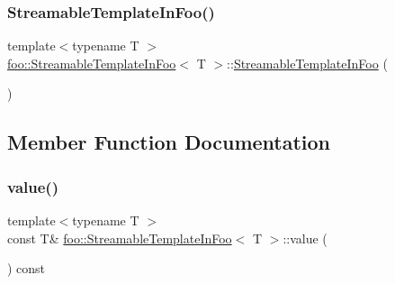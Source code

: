 \subsubsection{\texorpdfstring{StreamableTemplateInFoo()}{StreamableTemplateInFoo()}\hspace{0.1cm}{\footnotesize\ttfamily [3/3]}}
{\footnotesize\ttfamily template$<$typename T $>$ \\
\mbox{\hyperlink{classfoo_1_1_streamable_template_in_foo}{foo\+::\+Streamable\+Template\+In\+Foo}}$<$ T $>$\+::\mbox{\hyperlink{classfoo_1_1_streamable_template_in_foo}{Streamable\+Template\+In\+Foo}} (\begin{DoxyParamCaption}{ }\end{DoxyParamCaption})\hspace{0.3cm}{\ttfamily [inline]}}



\subsection{Member Function Documentation}
\mbox{\label{classfoo_1_1_streamable_template_in_foo_aa6e29a9a298014ce74c65423b6985023}} 
\subsubsection{\texorpdfstring{value()}{value()}\hspace{0.1cm}{\footnotesize\ttfamily [1/3]}}
{\footnotesize\ttfamily template$<$typename T $>$ \\
const T\& \mbox{\hyperlink{classfoo_1_1_streamable_template_in_foo}{foo\+::\+Streamable\+Template\+In\+Foo}}$<$ T $>$\+::value (\begin{DoxyParamCaption}{ }\end{DoxyParamCaption}) const\hspace{0.3cm}{\ttfamily [inline]}}

\mbox{\label{classfoo_1_1_streamable_template_in_foo_aa6e29a9a298014ce74c65423b6985023}} 
